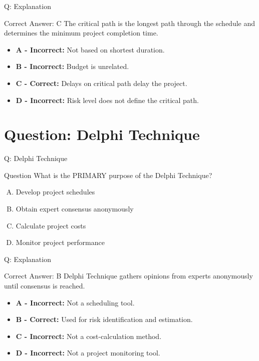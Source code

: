 \documentclass{beamer}
\begin{document}
	\begin{frame}{Q: Explanation}
		\begin{block}{Correct Answer: C}
			The critical path is the longest path through the schedule
			and determines the minimum project completion time.
		\end{block}
		
		\begin{itemize}
			\item \textbf{A - Incorrect:} Not based on shortest duration.
			\item \textbf{B - Incorrect:} Budget is unrelated.
			\item \textbf{C - Correct:} Delays on critical path delay the project.
			\item \textbf{D - Incorrect:} Risk level does not define the critical path.
		\end{itemize}
	\end{frame}
	
	\section{Question: Delphi Technique}
	
	\begin{frame}{Q: Delphi Technique}
		\begin{block}{Question}
			What is the PRIMARY purpose of the Delphi Technique?
		\end{block}
		
		\begin{enumerate}[(A)]
			\item Develop project schedules
			\item Obtain expert consensus anonymously
			\item Calculate project costs
			\item Monitor project performance
		\end{enumerate}
	\end{frame}
	
	\begin{frame}{Q: Explanation}
		\begin{block}{Correct Answer: B}
			Delphi Technique gathers opinions from experts
			anonymously until consensus is reached.
		\end{block}
		
		\begin{itemize}
			\item \textbf{A - Incorrect:} Not a scheduling tool.
			\item \textbf{B - Correct:} Used for risk identification and estimation.
			\item \textbf{C - Incorrect:} Not a cost-calculation method.
			\item \textbf{D - Incorrect:} Not a project monitoring tool.
		\end{itemize}
	\end{frame}
	
\end{document}
